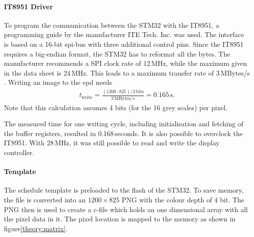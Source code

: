 \paragraph{IT8951 Driver}
To program the communication between the STM32 with the IT8951, a programming guide by the manufacturer ITE Tech. Inc. was used.
The interface is based on a 16-bit \acs{spi}-bus with three additional control pins. Since the IT8951 requires a big-endian format, the STM32 has to reformat all the bytes. 
The manufacturer recommends a SPI clock rate of 12\,MHz, while the maximum given in the data sheet is 24\,MHz.
This leads to a maximum transfer rate of 3\,MBytes/s  \cite{IT8951}. 
Writing an image to the \acs{epd} needs  
\begin{align}
	t_{\text{write}}=\frac{(1200\cdot 825)/2\,\text{bits}}{3\,\text{MBytes}/s}=0.165\,\text{s}.
\end{align}
Note that this calculation assumes 4 bits (for the 16 grey scales) per pixel.

The measured time for one writing cycle, including initialisation and fetching of the buffer registers, resulted in 0.168\,seconds. It is also possible to overclock the IT8951.
With 28\,MHz, it was still possible to read and write the display controller.      

\paragraph{Template}
The schedule template is preloaded to the flash of the STM32. To save memory, the file is converted into an $1200 \times 825$ PNG with the colour depth of 4 bit. The PNG then is used to create a c-file which holds an one dimensional array with all the pixel data in it. The pixel location is mapped to the memory as shown in figure\ref{theory:matrix}. 

